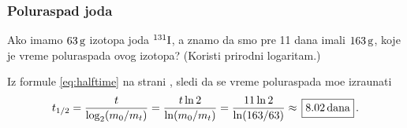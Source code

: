 \subsubsection{Poluraspad joda}

\zadatak {}
Ako imamo $63\,{\rm g}$ izotopa joda $\iso 131-I$, a znamo da smo pre 11 dana imali $163\,{\rm g}$, koje je vreme
poluraspada ovog izotopa? (Koristi prirodni logaritam.)

\resenje
Iz formule \eqref{eq:halftime} na strani \pageref{eq:halftime}, sledi da se vreme poluraspada
mo{\zv}e izra{\cv}unati
$$
\th
={t\over \logtwo(m_0 / m_t)}
={t\ln2\over \ln(m_0 / m_t)}
={11\ln2\over\ln(163/63)}
\approx\ram{8.02\um{dana}}.
$$
